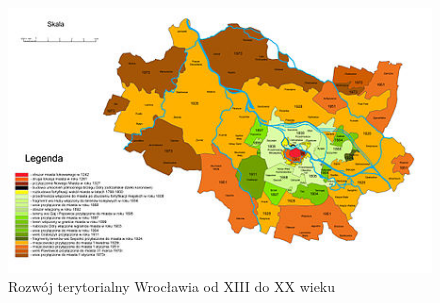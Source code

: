 \documentclass{article}
\begin{document}
\begin{figure}[h!]
\centering
\includegraphics[scale=2]{450px-Rozwój_terytorialny_Wrocławia.jpg}
\caption{Rozwój terytorialny Wrocławia od XIII do XX wieku}
\label{fig:rozwojter}
\end{figure}
\end{document}
